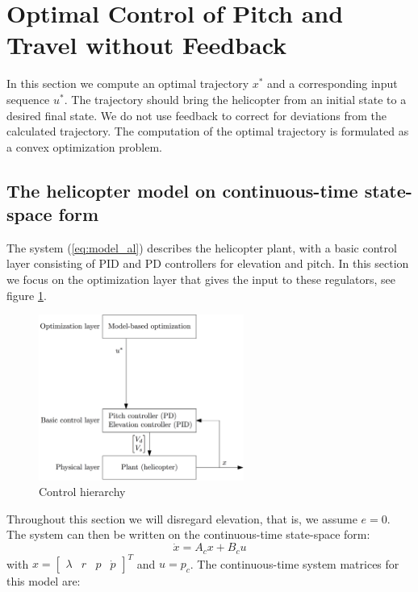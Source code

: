 \section{Optimal Control of Pitch and Travel without Feedback}\label{sec:prob2}

In this section we compute an optimal trajectory $x^*$ and a corresponding input sequence $u^*$. The trajectory should bring the helicopter from an initial state to a desired final state. We do not use feedback to correct for deviations from the calculated trajectory. The computation of the optimal trajectory is formulated as a convex optimization problem.

\subsection{The helicopter model on continuous-time state-space form}
The system (\ref{eq:model_al}) describes the helicopter plant, with a basic control layer consisting of PID and PD controllers for elevation and pitch. In this section we focus on the optimization layer that gives the input to these regulators, see figure \ref{fig:control_hierarchy}.
\begin{figure}[ht]
    \centering
    \includegraphics[width=0.6\textwidth]{figures/day2/control_hierarchy_day2}
    \caption{Control hierarchy}
    \label{fig:control_hierarchy}
\end{figure}
Throughout this section we will disregard elevation, that is, we assume $e = 0$.
The system can then be written on the continuous-time state-space form:
\begin{equation}
    \dot{x} = A_cx + B_cu
    \label{eq:state_space_axbu}
\end{equation}
with $x = \begin{bmatrix} \lambda & r & p & \dot{p} \end{bmatrix}^T$ and $u = p_c$.
The continuous-time system matrices for this model are:
